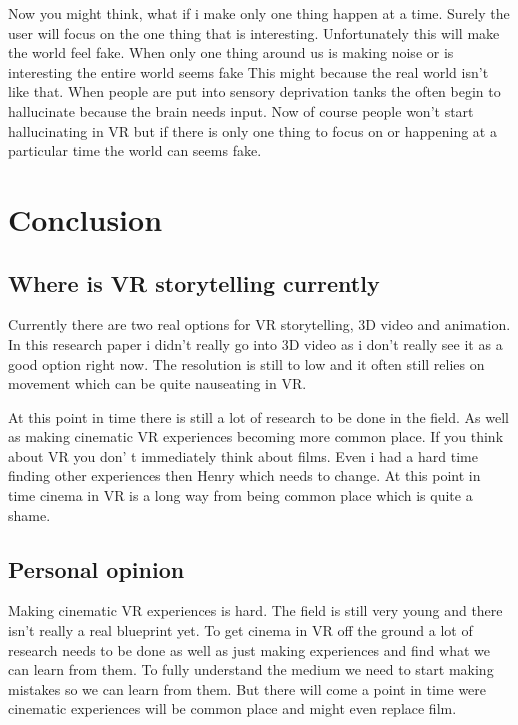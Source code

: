 \documentclass{report}
\newcommand{\comment}[1]{}
\begin{document}
				Now you might think, what if i make only one thing happen at a time. Surely the user will focus on the one thing that is interesting. Unfortunately this will make the world feel fake. When only one thing around us is making noise or is interesting the entire world seems fake This might because the real world isn't like that. When people are put into sensory deprivation tanks the often begin to hallucinate because the brain needs input. Now of course people won't start hallucinating in VR but if there is only one thing to focus on or happening at a particular time the world can seems fake. \comment{\todo{look into this}}
				
								
				\chapter{Conclusion}
				\section{Where is VR storytelling currently}
				
				Currently there are two real options for VR storytelling, 3D video and animation. In this research paper i didn't really go into 3D video as i don't really see it as a good option right now. The resolution is still to low and it often still relies on movement which can be quite nauseating in VR. 
				
				At this point in time there is still a lot of research to be done in the field. As well as making cinematic VR experiences becoming more common place. If you think about VR you don' t immediately think about films. Even i had a hard time finding other experiences then Henry which needs to change. At this point in time cinema in VR is a long way from being common place which is quite a shame.
				
				
				
				\section{Personal opinion}
				
				Making cinematic VR experiences is hard. The field is still very young and there isn't really a real blueprint yet. To get cinema in VR off the ground a lot of research needs to be done as well as just making experiences and find what we can learn from them. To fully understand the medium we need to start making mistakes so we can learn from them.
				But there will come a point in time were cinematic experiences will be common place and might even replace film.
\end{document}
